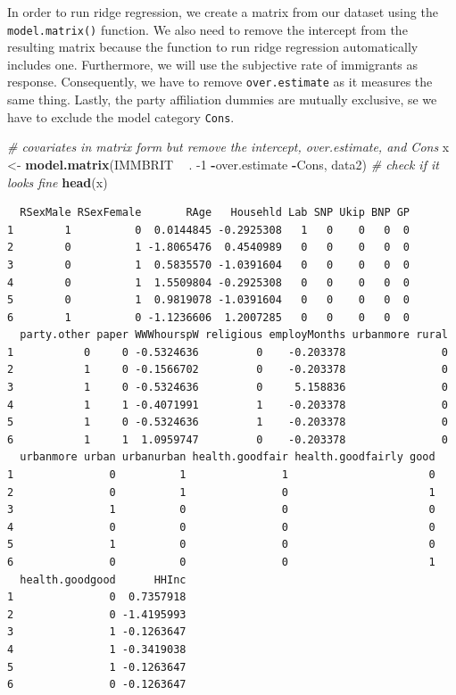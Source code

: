 \documentclass[]{article}
\newenvironment{Shaded}{\begin{snugshade}}{\end{snugshade}}
\newcommand{\CommentTok}[1]{\textcolor[rgb]{0.56,0.35,0.01}{\textit{#1}}}
\newcommand{\DecValTok}[1]{\textcolor[rgb]{0.00,0.00,0.81}{#1}}
\newcommand{\KeywordTok}[1]{\textcolor[rgb]{0.13,0.29,0.53}{\textbf{#1}}}
\newcommand{\NormalTok}[1]{#1}
\newcommand{\OperatorTok}[1]{\textcolor[rgb]{0.81,0.36,0.00}{\textbf{#1}}}
\newcommand{\StringTok}[1]{\textcolor[rgb]{0.31,0.60,0.02}{#1}}
\begin{document}
In order to run ridge regression, we create a matrix from our dataset using the \texttt{model.matrix()} function. We also need to remove the intercept from the resulting matrix because the function to run ridge regression automatically includes one. Furthermore, we will use the subjective rate of immigrants as response. Consequently, we have to remove \texttt{over.estimate} as it measures the same thing. Lastly, the party affiliation dummies are mutually exclusive, se we have to exclude the model category \texttt{Cons}.

\begin{Shaded}
\begin{Highlighting}[]
\CommentTok{# covariates in matrix form but remove the intercept, over.estimate, and Cons}
\NormalTok{x <-}\StringTok{ }\KeywordTok{model.matrix}\NormalTok{(IMMBRIT }\OperatorTok{~}\StringTok{ }\NormalTok{. }\DecValTok{-1} \OperatorTok{-}\NormalTok{over.estimate }\OperatorTok{-}\NormalTok{Cons, data2)}
\CommentTok{# check if it looks fine}
\KeywordTok{head}\NormalTok{(x)}
\end{Highlighting}
\end{Shaded}

\begin{verbatim}
  RSexMale RSexFemale       RAge   Househld Lab SNP Ukip BNP GP
1        1          0  0.0144845 -0.2925308   1   0    0   0  0
2        0          1 -1.8065476  0.4540989   0   0    0   0  0
3        0          1  0.5835570 -1.0391604   0   0    0   0  0
4        0          1  1.5509804 -0.2925308   0   0    0   0  0
5        0          1  0.9819078 -1.0391604   0   0    0   0  0
6        1          0 -1.1236606  1.2007285   0   0    0   0  0
  party.other paper WWWhourspW religious employMonths urbanmore rural
1           0     0 -0.5324636         0    -0.203378               0
2           1     0 -0.1566702         0    -0.203378               0
3           1     0 -0.5324636         0     5.158836               0
4           1     1 -0.4071991         1    -0.203378               0
5           1     0 -0.5324636         1    -0.203378               0
6           1     1  1.0959747         0    -0.203378               0
  urbanmore urban urbanurban health.goodfair health.goodfairly good
1               0          1               1                      0
2               0          1               0                      1
3               1          0               0                      0
4               0          0               0                      0
5               1          0               0                      0
6               0          0               0                      1
  health.goodgood      HHInc
1               0  0.7357918
2               0 -1.4195993
3               1 -0.1263647
4               1 -0.3419038
5               1 -0.1263647
6               0 -0.1263647
\end{verbatim}
\end{document}
